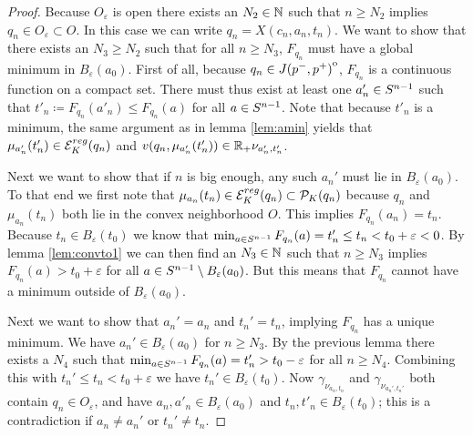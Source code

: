 \begin{proof}
    Because $O_\varepsilon$ is open there exists an $N_2\in \mathbb{N}$ such that $n\ge N_2$ implies $q_n\in O_\varepsilon\subset O$.
    In this case we can write $q_n = X(c_n,a_n,t_n)$. We want to show that there exists an $N_3\ge N_2$ such that for all $n\ge N_3$, $F_{q_n}$ must have a global minimum in $B_\varepsilon(a_0)$. First of all, because $q_n \in {\kern0ptJ(p^-,p^+)}^{\mathrm{o}}$, $F_{q_n}$ is a continuous function on a compact set. There must thus exist at least one $a'_n\in {S^{n-1}}$ such that $t'_n \coloneqq  F_{q_n}(a'_n) \leq F_{q_n}(a)$ for all $a\in {S^{n-1}}$. Note that because $t'_n$ is a minimum, the same argument as in lemma \ref{lem:amin} yields that $\mu_{a'_n}(t_n')\in {{\mathcal{E}}^{reg}_K}(q_n)$ and $v(q_n,\mu_{a'_n}(t_n')) \in \mathbb{R}_+\nu_{a_n',t_n'}$.
    
    Next we want to show that if $n$ is big enough, any such $a_n'$ must lie in $B_\varepsilon(a_0)$. 
    To that end we first note that  $\mu_{a_n}(t_n)\in {{\mathcal{E}}^{reg}_K}(q_n)\subset {\mathcal{P}}_K(q_n)$ because $q_n$ and $\mu_{a_n}(t_n)$ both lie in the convex neighborhood $O$. 
    This implies $F_{q_n}(a_n)=t_n$. 
    Because $t_n\in B_\varepsilon(t_0)$ we know that $\min_{a\in {S^{n-1}}}F_{q_n}(a) = t'_n\leq t_n < t_0+\varepsilon < 0$. 
    By lemma \ref{lem:convto1} we can then find an $N_3\in \mathbb{N}$ such that $n\ge N_3$ implies $F_{q_n}(a)>t_0+\varepsilon$ for all $a\in {S^{n-1}} \setminus B_\varepsilon(a_0)$. But this means that $F_{q_n}$ cannot have a minimum outside of $B_\varepsilon(a_0)$.

    Next we want to show that $a_n'=a_n$ and $t_n'=t_n$, implying $F_{q_n}$ has a unique minimum.
    We have $a_n'\in B_\varepsilon(a_0)$ for $n\ge N_3$. By the previous lemma there exists a $N_4$ such that $\min_{a\in {S^{n-1}}} F_{q_n}(a)=t'_n> t_0-\varepsilon$ for all $n\ge N_4$. Combining this with $t_n'\leq t_n < t_0+\varepsilon$ we have $t_n'\in B_\varepsilon(t_0)$. Now $\gamma_{\nu_{a_n,t_n}}$ and $\gamma_{\nu_{a_n',t_n'}}$ both contain $q_n\in O_\varepsilon$, and have $a_n,a'_n\in B_\varepsilon(a_0)$ and $t_n,t'_n\in B_\varepsilon(t_0)$; this is a contradiction if $a_n\neq a_n'$ or $t_n'\neq t_n$. 


\end{proof}
